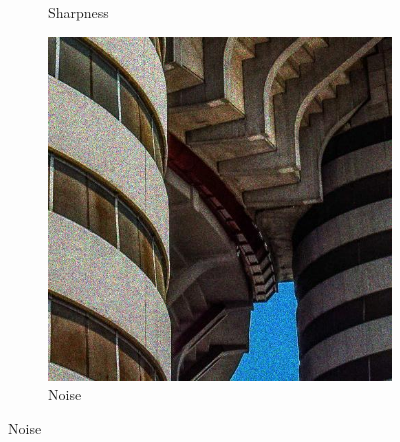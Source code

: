 \begin{figure}[ht]
\begin{subfigure}[b]{0.24\textwidth}
        \caption{Sharpness}
        \label{fig:sharpness}
    \end{subfigure}
    \hfill
    \begin{subfigure}[b]{0.24\textwidth}
        \includegraphics[width=\textwidth]{img/Noise.jpg}
        \caption{Noise}
        \label{fig:noise}
    \end{subfigure} 


\end{figure}
